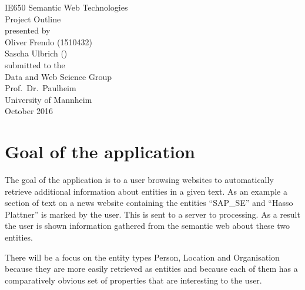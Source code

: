 \documentclass[11pt,titlepage,oneside,openany]{article}
\begin{document}
\begin{titlepage}
	\vspace*{2cm}
  \begin{center}
   {\Large IE650 Semantic Web Technologies\\}
   \vspace{2cm} 
   {Project Outline\\}
   \vspace{2cm}
   {presented by\\
    Oliver Frendo (1510432) \\
    Sascha Ulbrich () \\
   }
   \vspace{1cm} 
   {submitted to the\\
    Data and Web Science Group\\
    Prof.\ Dr.\ Paulheim\\
    University of Mannheim\\} \vspace{2cm}
   {October 2016}
  \end{center}
\end{titlepage} 






\newpage



\section{Goal of the application}
The goal of the application is to a user browsing websites to automatically
retrieve additional information about entities in a given text. 
As an example a section of text on a news website containing the entities
``SAP\_SE'' and ``Hasso Plattner'' is marked by the user. This is sent to
a server to processing. As a result the user is shown information gathered from
the semantic web about these two entities. 

There will be a focus on the entity types Person, Location and Organisation
because they are more easily retrieved as entities and because each of them has
a comparatively obvious set of properties that are interesting to the user.
\end{document}
